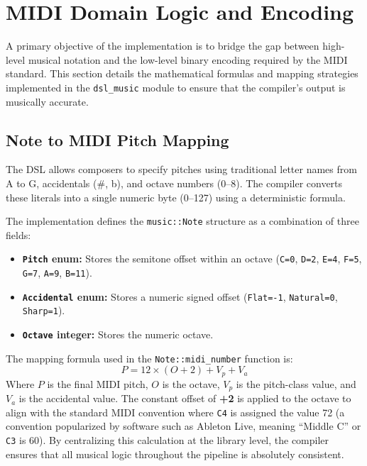 \section{MIDI Domain Logic and Encoding}\label{sec:implementation-music-logic}

A primary objective of the implementation is to bridge the gap between high-level musical notation and the low-level
binary encoding required by the MIDI standard.
This section details the mathematical formulas and mapping strategies implemented in the \texttt{dsl\_music} module to
ensure that the compiler's output is musically accurate.

\subsection{Note to MIDI Pitch Mapping}\label{subsec:note-to-midi-pitch-mapping}

The DSL allows composers to specify pitches using traditional letter names from A to G, accidentals (\#, b), and
octave numbers
(0--8).
The compiler converts these literals into a single numeric byte (0--127) using a deterministic formula.

The implementation defines the \texttt{music::Note} structure as a combination of three fields:
\begin{itemize}
  \item \textbf{\texttt{Pitch} enum:} Stores the semitone offset within an octave (\texttt{C=0}, \texttt{D=2},
    \texttt{E=4}, \texttt{F=5}, \texttt{G=7}, \texttt{A=9}, \texttt{B=11}).
  \item \textbf{\texttt{Accidental} enum:} Stores a numeric signed offset (\texttt{Flat=-1}, \texttt{Natural=0},
    \texttt{Sharp=1}).
  \item \textbf{\texttt{Octave} integer:} Stores the numeric octave.
\end{itemize}

The mapping formula used in the \texttt{Note::midi\_number} function is:
\begin{equation}
  P = 12 \times (O + 2) + V_p + V_a\label{eq:equation}
\end{equation}
Where $P$ is the final MIDI pitch, $O$ is the octave, $V_p$ is the pitch-class value, and $V_a$ is the accidental value.
The constant offset of \textbf{+2} is applied to the octave to align with the standard MIDI convention where \texttt{C4}
is assigned the value 72 (a convention popularized by software such as Ableton Live, meaning ``Middle C'' or \texttt{C3}
is 60).
By centralizing this calculation at the library level, the compiler ensures that all musical logic throughout the
pipeline is absolutely consistent.

